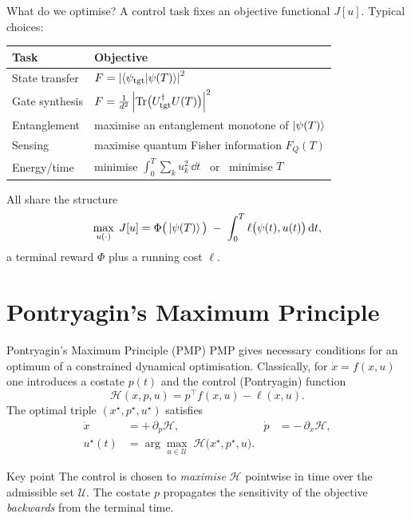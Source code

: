 \documentclass[10pt,aspectratio=169]{beamer}
\newcommand{\Hc}{\mathcal{H}}                 %
\newcommand{\FQ}{F_{\!Q}}
\begin{document}
\begin{frame}{What do we optimise?}
  A control task fixes an objective functional $J[u]$. Typical choices:
  \begin{center}
  \begin{tabular}{@{}ll@{}}
    \toprule
    \textbf{Task} & \textbf{Objective} \\
    \midrule
    State transfer & $F = \abs{\braket{\psi_{\mathrm{tgt}}}{\psi(T)}}^2$ \\
    Gate synthesis & $F = \tfrac{1}{d^2}\,\abs{\Tr\!\big(U_{\mathrm{tgt}}^\dagger U(T)\big)}^2$ \\
    Entanglement   & maximise an entanglement monotone of $\ket{\psi(T)}$ \\
    Sensing        & maximise quantum Fisher information $\FQ(T)$ \\
    Energy/time    & minimise $\int_0^T \sum_k u_k^2\,\dd t$ \ or \ minimise $T$ \\
    \bottomrule
  \end{tabular}
  \end{center}
  \vspace{0.6em}
  All share the structure
  \[
    \max_{u(\cdot)}\; J[u]=\Phi\big(\ket{\psi(T)}\big)
      \;-\;\int_0^T \ell\big(\psi(t),u(t)\big)\,\dd t,
  \]
  a terminal reward $\Phi$ plus a running cost $\ell$.
\end{frame}

\section{Pontryagin's Maximum Principle}

\begin{frame}{Pontryagin's Maximum Principle (PMP)}
  PMP gives \alert{necessary conditions} for an optimum of a constrained
  dynamical optimisation. Classically, for $\dot x = f(x,u)$ one introduces a
  costate $p(t)$ and the \alert{control (Pontryagin) function}
  \[
    \Hc(x,p,u) = p^{\!\top} f(x,u) - \ell(x,u).
  \]
  The optimal triple $(x^\star,p^\star,u^\star)$ satisfies
  \begin{align}
    \dot x      &= +\,\partial_p \Hc, &
    \dot p      &= -\,\partial_x \Hc, \\[2pt]
    u^\star(t)  &= \arg\max_{u\in\mathcal{U}} \;\Hc\big(x^\star,p^\star,u\big).
  \end{align}
  \begin{alertblock}{Key point}
    The control is chosen to \emph{maximise} $\Hc$ pointwise in time over the
    admissible set $\mathcal{U}$. The costate $p$ propagates the sensitivity of
    the objective \emph{backwards} from the terminal time.
  \end{alertblock}
\end{frame}
\end{document}
